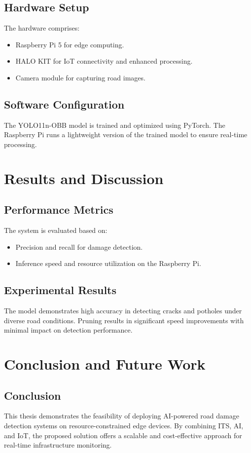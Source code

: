 \documentclass[12pt,a4paper]{report}
\begin{document}
\section{Hardware Setup}
The hardware comprises:
\begin{itemize}
    \item Raspberry Pi 5 for edge computing.
    \item HALO KIT for IoT connectivity and enhanced processing.
    \item Camera module for capturing road images.
\end{itemize}

\section{Software Configuration}
The YOLO11n-OBB model is trained and optimized using PyTorch. The Raspberry Pi runs a lightweight version of the trained model to ensure real-time processing.

\chapter{Results and Discussion}
\section{Performance Metrics}
The system is evaluated based on:
\begin{itemize}
    \item Precision and recall for damage detection.
    \item Inference speed and resource utilization on the Raspberry Pi.
\end{itemize}

\section{Experimental Results}
The model demonstrates high accuracy in detecting cracks and potholes under diverse road conditions. Pruning results in significant speed improvements with minimal impact on detection performance.

\chapter{Conclusion and Future Work}
\section{Conclusion}
This thesis demonstrates the feasibility of deploying AI-powered road damage detection systems on resource-constrained edge devices. By combining ITS, AI, and IoT, the proposed solution offers a scalable and cost-effective approach for real-time infrastructure monitoring.
\end{document}

